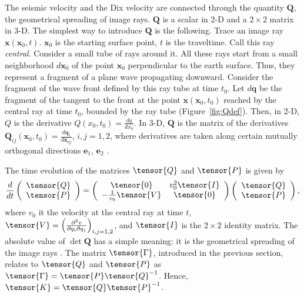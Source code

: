 The seismic velocity and the Dix
velocity are connected through the quantity $\mathbf{Q}$, the
geometrical spreading of image rays.  $\mathbf{Q}$ is a scalar in 2-D
and a $2\times 2$ matrix in 3-D.  The simplest way to introduce
$\mathbf{Q}$ is the following. Trace an image ray
$\mathbf{x}(\mathbf{x}_0,t)$. $\mathbf{x}_0$ is the
starting surface point, $t$ is the traveltime. Call this ray
\emph{central}. Consider a small tube of rays around it.  All these
rays start from a small neighborhood $d\mathbf{x}_0$ of the point
$\mathbf{x}_0$ perpendicular to the earth surface.  Thus, they
represent a fragment of a plane wave propagating downward.  Consider
the fragment of the wave front defined by this ray tube at time $t_0$.
Let $d\mathbf{q}$ be the fragment of the tangent to the front at the
point $\mathbf{x}(\mathbf{x}_0,t_0)$ reached by the central ray at
time $t_0$, bounded by the ray tube (Figure~\ref{fig:Qdef}).  Then, in
2-D, $Q$ is the derivative $Q(x_0,t_0)=\frac{dq}{dx_0}$.  In 3-D,
$\mathbf{Q}$ is the matrix of the derivatives
$\mathbf{Q}_{ij}(\mathbf{x}_0,t_0)=
\frac{d\mathbf{q}_i}{d\mathbf{x}_{0j}}$, $i,j=1,2$, where
derivatives are taken along certain mutually orthogonal directions
$\mathbf{e}_1$, $\mathbf{e}_2$
\cite[]{popov-psencik,cerveny,popov}.



The time evolution of the matrices $\tensor{Q}$ and $\tensor{P}$  
is given by
\begin{equation}
\label{QPevol}
\frac{d}{dt}\left(\begin{array}{c}\tensor{Q}\\ \tensor{P}\end{array}\right)=
\left(\begin{array}{cc}\tensor{0}&v_0^2\tensor{I}\\-\frac{1}{v_0}\tensor{V}&\tensor{0}
\end{array}\right)
\left(\begin{array}{c}\tensor{Q}\\ \tensor{P}\end{array}\right),
\end{equation}
where $v_0$ it the velocity at the central ray at time $t$,
$\tensor{V}=\left(\frac{\partial^2 v}{\partial q_i\partial
    q_j}\right)_{i,j=1,2}$, and $\tensor{I}$ is the $2\times 2$
identity matrix.  The absolute value of $\det \mathbf{Q}$ has a simple
meaning: it is the geometrical spreading of the image rays
\cite[]{popov-psencik,cerveny,popov}.  The matrix $\tensor{\Gamma}$,
introduced in the previous section, relates to $\tensor{Q}$ and
$\tensor{P}$ as $\tensor{\Gamma}=\tensor{P}\tensor{Q}^{-1}$.  Hence,
$\tensor{K}=\tensor{Q}\tensor{P}^{-1}$.

